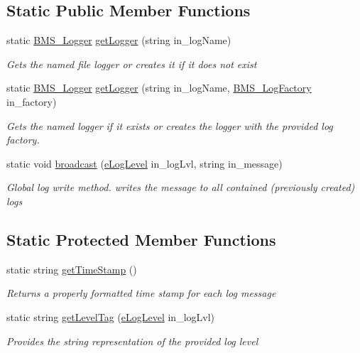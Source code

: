 \subsection*{Static Public Member Functions}
\begin{DoxyCompactItemize}
\item 
static \hyperlink{class_b_m_s_1_1_core_1_1_b_m_s___logger}{B\-M\-S\-\_\-\-Logger} \hyperlink{class_b_m_s_1_1_core_1_1_b_m_s___logger_a421d2ae8901e8f936fb51dd71c1e1e32}{get\-Logger} (string in\-\_\-log\-Name)
\begin{DoxyCompactList}\small\item\em Gets the named file logger or creates it if it does not exist \end{DoxyCompactList}\item 
static \hyperlink{class_b_m_s_1_1_core_1_1_b_m_s___logger}{B\-M\-S\-\_\-\-Logger} \hyperlink{class_b_m_s_1_1_core_1_1_b_m_s___logger_afd14fb9faa2e832bda16a5a5f7df41f1}{get\-Logger} (string in\-\_\-log\-Name, \hyperlink{class_b_m_s_1_1_core_1_1_b_m_s___log_factory}{B\-M\-S\-\_\-\-Log\-Factory} in\-\_\-factory)
\begin{DoxyCompactList}\small\item\em Gets the named logger if it exists or creates the logger with the provided log factory. \end{DoxyCompactList}\item 
static void \hyperlink{class_b_m_s_1_1_core_1_1_b_m_s___logger_aa1806fcef246153a42044f6afcb75177}{broadcast} (\hyperlink{namespace_b_m_s_1_1_core_a327c4f5128504a45ef61f00cfd661a43}{e\-Log\-Level} in\-\_\-log\-Lvl, string in\-\_\-message)
\begin{DoxyCompactList}\small\item\em Global log write method. writes the message to all contained (previously created) logs \end{DoxyCompactList}\end{DoxyCompactItemize}
\subsection*{Static Protected Member Functions}
\begin{DoxyCompactItemize}
\item 
static string \hyperlink{class_b_m_s_1_1_core_1_1_b_m_s___logger_a8abcf123f46bba68e51a222c0181a76c}{get\-Time\-Stamp} ()
\begin{DoxyCompactList}\small\item\em Returns a properly formatted time stamp for each log message \end{DoxyCompactList}\item 
static string \hyperlink{class_b_m_s_1_1_core_1_1_b_m_s___logger_a994ce67c23c15d7d52321ede3ff28f64}{get\-Level\-Tag} (\hyperlink{namespace_b_m_s_1_1_core_a327c4f5128504a45ef61f00cfd661a43}{e\-Log\-Level} in\-\_\-log\-Lvl)
\begin{DoxyCompactList}\small\item\em Provides the string representation of the provided log level \end{DoxyCompactList}\end{DoxyCompactItemize}
